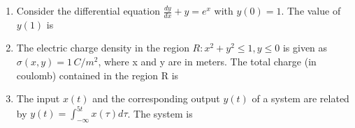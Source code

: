 \documentclass[journal,12pt,onecolumn]{IEEEtran}
\theoremstyle{remark}
\begin{document}
\begin{enumerate}
\vspace{0.5cm}

\item Consider the differential equation $\frac{dy}{dx} + y = e^x$ with $y(0) = 1$. The value of $y(1)$ is

\hfill{}
\begin{enumerate}  \end{enumerate}

\vspace{0.5cm}

\item The electric charge density in the region $R: x^2+y^2 \le 1, y \le 0$ is given as $\sigma(x,y) = 1 \, C/m^2$, where x and y are in meters. The total charge (in coulomb) contained in the region R is
\hfill{}\begin{enumerate}  \end{enumerate}

\vspace{0.5cm}

\item The input $x(t)$ and the corresponding output $y(t)$ of a system are related by $y(t) = \int_{-\infty}^{5t} x(\tau) d\tau$. The system is
\hfill{}\begin{enumerate}  \end{enumerate}


\end{enumerate}
\end{document}
